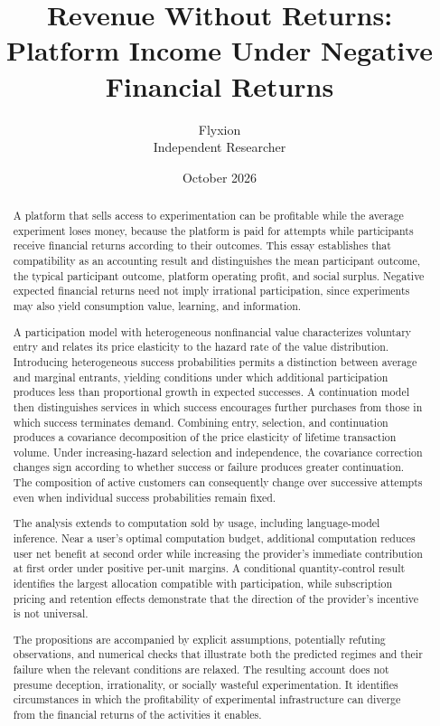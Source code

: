 \documentclass[11pt]{article}
\title{Revenue Without Returns:\\
Platform Income Under Negative Financial Returns}
\author{Flyxion\\Independent Researcher}
\date{October 2026}
\theoremstyle{remark}
\begin{document}
\maketitle
\thispagestyle{empty}

\begin{abstract}
A platform that sells access to experimentation can be profitable
while the average experiment loses money, because the platform is
paid for attempts while participants receive financial returns
according to their outcomes. This essay establishes that
compatibility as an accounting result and distinguishes the mean
participant outcome, the typical participant outcome, platform
operating profit, and social surplus. Negative expected financial
returns need not imply irrational participation, since experiments
may also yield consumption value, learning, and information.

A participation model with heterogeneous nonfinancial value
characterizes voluntary entry and relates its price elasticity
to the hazard rate of the value distribution. Introducing
heterogeneous success probabilities permits a distinction between
average and marginal entrants, yielding conditions under which
additional participation produces less than proportional growth
in expected successes. A continuation model then distinguishes
services in which success encourages further purchases from those
in which success terminates demand. Combining entry, selection,
and continuation produces a covariance decomposition of the price
elasticity of lifetime transaction volume. Under increasing-hazard
selection and independence, the covariance correction changes
sign according to whether success or failure produces greater
continuation. The composition of active customers can consequently
change over successive attempts even when individual success
probabilities remain fixed.

The analysis extends to computation sold by usage, including
language-model inference. Near a user's optimal computation
budget, additional computation reduces user net benefit at
second order while increasing the provider's immediate contribution
at first order under positive per-unit margins. A conditional
quantity-control result identifies the largest allocation compatible
with participation, while subscription pricing and retention
effects demonstrate that the direction of the provider's incentive
is not universal.

The propositions are accompanied by explicit assumptions,
potentially refuting observations, and numerical checks that
illustrate both the predicted regimes and their failure when
the relevant conditions are relaxed. The resulting account
does not presume deception, irrationality, or socially wasteful
experimentation. It identifies circumstances in which the
profitability of experimental infrastructure can diverge from
the financial returns of the activities it enables.
\end{abstract}
\end{document}

